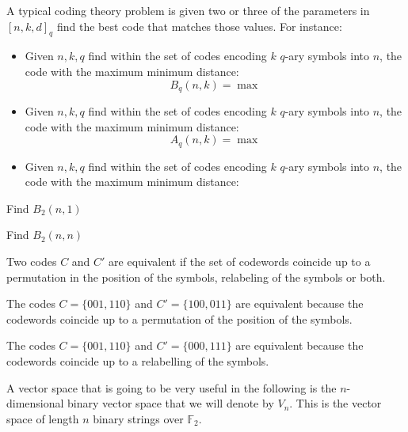A typical coding theory problem is given two or three of the parameters in $[n,k,d]_q$ find the best code that matches those values. For instance:
\begin{itemize}
\item Given $n,k,q$ find within the set of codes encoding $k$ $q$-ary symbols into $n$, the code with the maximum minimum distance:
\begin{equation}
B_q(n,k)=\max
\end{equation}
\item Given $n,k,q$ find within the set of codes encoding $k$ $q$-ary symbols into $n$, the code with the maximum minimum distance:
\begin{equation}
A_q(n,k)=\max
\end{equation}
\item Given $n,k,q$ find within the set of codes encoding $k$ $q$-ary symbols into $n$, the code with the maximum minimum distance:
\end{itemize}
\begin{exercise}
Find $B_2(n,1)$
\end{exercise}
\begin{exercise}
Find $B_2(n,n)$
\end{exercise}
\begin{definition}
Two codes $C$ and $C'$ are equivalent if the set of codewords coincide up to a permutation in the position of the symbols, relabeling of the symbols or both.
\end{definition}
\begin{example}
The codes $C=\{001,110\}$ and $C'=\{100,011\}$ are equivalent because the codewords coincide up to a permutation of the position of the symbols.
\end{example}
\begin{example}
The codes $C=\{001,110\}$ and $C'=\{000,111\}$ are equivalent because the codewords coincide up to a relabelling of the symbols.
\end{example}

A vector space that is going to be very useful in the following is the $n$-dimensional binary vector space that we will denote by $V_n$. This is the vector space of length $n$ binary strings over $\mathbb F_2$. 

